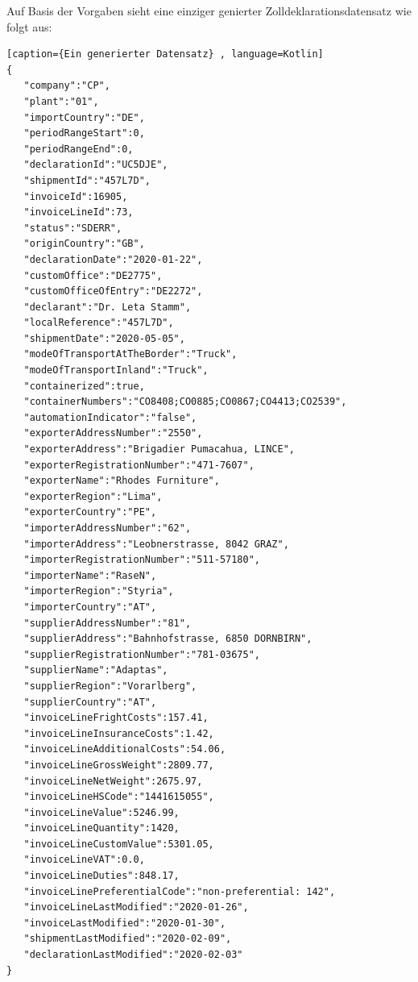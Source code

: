 Auf Basis der Vorgaben sieht eine einziger genierter Zolldeklarationsdatensatz wie folgt aus:
\newpage
\begin{lstlisting}[caption={Ein generierter Datensatz} , language=Kotlin]
{
   "company":"CP",
   "plant":"01",
   "importCountry":"DE",
   "periodRangeStart":0,
   "periodRangeEnd":0,
   "declarationId":"UC5DJE",
   "shipmentId":"457L7D",
   "invoiceId":16905,
   "invoiceLineId":73,
   "status":"SDERR",
   "originCountry":"GB",
   "declarationDate":"2020-01-22",
   "customOffice":"DE2775",
   "customOfficeOfEntry":"DE2272",
   "declarant":"Dr. Leta Stamm",
   "localReference":"457L7D",
   "shipmentDate":"2020-05-05",
   "modeOfTransportAtTheBorder":"Truck",
   "modeOfTransportInland":"Truck",
   "containerized":true,
   "containerNumbers":"CO8408;CO0885;CO0867;CO4413;CO2539",
   "automationIndicator":"false",
   "exporterAddressNumber":"2550",
   "exporterAddress":"Brigadier Pumacahua, LINCE",
   "exporterRegistrationNumber":"471-7607",
   "exporterName":"Rhodes Furniture",
   "exporterRegion":"Lima",
   "exporterCountry":"PE",
   "importerAddressNumber":"62",
   "importerAddress":"Leobnerstrasse, 8042 GRAZ",
   "importerRegistrationNumber":"511-57180",
   "importerName":"RaseN",
   "importerRegion":"Styria",
   "importerCountry":"AT",
   "supplierAddressNumber":"81",
   "supplierAddress":"Bahnhofstrasse, 6850 DORNBIRN",
   "supplierRegistrationNumber":"781-03675",
   "supplierName":"Adaptas",
   "supplierRegion":"Vorarlberg",
   "supplierCountry":"AT",
   "invoiceLineFrightCosts":157.41,
   "invoiceLineInsuranceCosts":1.42,
   "invoiceLineAdditionalCosts":54.06,
   "invoiceLineGrossWeight":2809.77,
   "invoiceLineNetWeight":2675.97,
   "invoiceLineHSCode":"1441615055",
   "invoiceLineValue":5246.99,
   "invoiceLineQuantity":1420,
   "invoiceLineCustomValue":5301.05,
   "invoiceLineVAT":0.0,
   "invoiceLineDuties":848.17,
   "invoiceLinePreferentialCode":"non-preferential: 142",
   "invoiceLineLastModified":"2020-01-26",
   "invoiceLastModified":"2020-01-30",
   "shipmentLastModified":"2020-02-09",
   "declarationLastModified":"2020-02-03"
}
\end{lstlisting}
